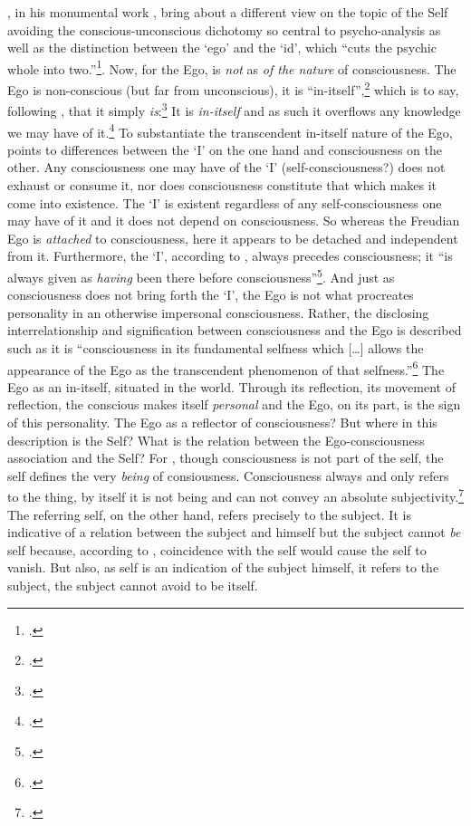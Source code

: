 \citeauthor{sartre43}, in his monumental work , bring about a different view on the topic of the Self avoiding the conscious-unconscious dichotomy so central to psycho-analysis as well as the distinction between the `ego' and the `id', which ``cuts the psychic whole into two.''\footcite[][74]{sartre43}. Now, for \citeauthor{sartre43} the Ego, is \emph{not} as \emph{of the nature} of consciousness. The Ego is non-conscious (but far from unconscious), it is ``in-itself'',\footcite[127]{sartre43} which is to say, following \citeauthor{sartre43}, that it simply \emph{is}:\footcite[22]{sartre43} It is \emph{in-itself} and as such it overflows any knowledge we may have of it.\footcite[Sartre specifies the categories of Being, for-itself and in-itself where the for-itself is the nihilation of Being-in-itself. The central theme of Nothingsness is closely related to for-itself. Of the in-itself can only be said, according to Sartre, that it \emph{is}: ``being is opaque to itself precisely because it is filled with itself.''][21, 97, 650]{sartre43} To substantiate the transcendent in-itself nature of the Ego, \citeauthor{sartre43} points to differences between the `I' on the one hand and consciousness on the other. Any consciousness one may have of the `I' (self-consciousness?) does not exhaust or consume it, nor does consciousness constitute that which makes it come into existence. The `I' is existent regardless of any self-consciousness one may have of it and it does not depend on consciousness. So whereas the Freudian Ego is \emph{attached} to consciousness, here it appears to be detached and independent from it. Furthermore, the `I', according to \citeauthor{sartre43}, always precedes consciousness; it ``is always given as \emph{having} been there before consciousness''\footcite[ (italics by the author)]{sartre43}. And just as consciousness does not bring forth the `I', the Ego is not what procreates personality in an otherwise impersonal consciousness. Rather, the disclosing interrelationship and signification between consciousness and the Ego is described such as it is ``consciousness in its fundamental selfness which [\ldots] allows the appearance of the Ego as the transcendent phenomenon of that selfness.''\footcite[127]{sartre43} The Ego as an in-itself, situated in the world. Through its reflection, its movement of reflection, the conscious makes itself \emph{personal} and the Ego, on its part, is the sign of this personality. The Ego as a reflector of consciousness? But where in this description is the Self? What is the relation between the Ego-consciousness association and the Self? For \citeauthor{sartre43}, though consciousness is not part of the self, the self defines the very \emph{being} of consiousness. Consciousness always and only refers to the thing, by itself it is not being and can not convey an absolute subjectivity.\footcite[638]{sartre43} The referring self, on the other hand, refers precisely to the subject. It is indicative of a relation between the subject and himself but the subject cannot \emph{be} self because, according to \citeauthor{sartre43}, coincidence with the self would cause the self to vanish. But also, as self is an indication of the subject himself, it refers to the subject, the subject cannot avoid to be itself. 